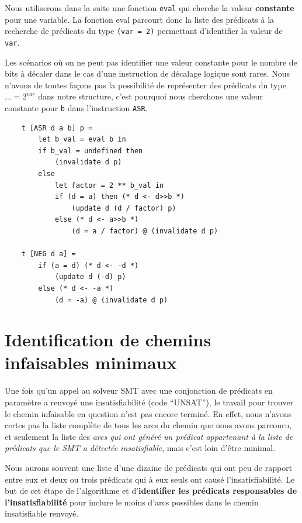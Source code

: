 \documentclass[french]{article}
\begin{document}
  Nous utiliserons dans la suite une fonction \texttt{eval} qui cherche la valeur \textbf{constante} pour une variable.
  La fonction eval parcourt donc la liste des prédicats à la recherche de prédicats du type \texttt{(var = 2)} permettant
  d'identifier la valeur de \texttt{var}.

  Les scénarios où on ne peut pas identifier une valeur constante pour le nombre de bits à décaler dans le cas d'une instruction
  de décalage logique sont rares. Nous n'avons de toutes façons pas la possibilité de représenter des prédicats du type $... = 2^{var}$
  dans notre structure, c'est pourquoi nous cherchons une valeur constante pour \texttt{b} dans l'instruction \texttt{ASR}.

  \begin{lstlisting}
    t [ASR d a b] p =
        let b_val = eval b in
        if b_val = undefined then
            (invalidate d p)
        else
            let factor = 2 ** b_val in
            if (d = a) then (* d <- d>>b *)
                (update d (d / factor) p)
            else (* d <- a>>b *)
                (d = a / factor) @ (invalidate d p)

    t [NEG d a] =
        if (a = d) (* d <- -d *)
            (update d (-d) p)
        else (* d <- -a *)
            (d = -a) @ (invalidate d p)
  \end{lstlisting}

  \newpage{}
  \section{Identification de chemins infaisables minimaux}
  Une fois qu'un appel au solveur SMT avec une conjonction de prédicats en paramètre a renvoyé une insatisfiabilité (code ``UNSAT''), le travail pour trouver le chemin infaisable en question n'est pas encore terminé. En effet, nous n'avons certes pas la liste complète de tous les arcs du chemin que nous avons parcouru, et seulement la liste des \textit{arcs qui ont généré un prédicat appartenant à la liste de prédicats que le SMT a détectée insatisfiable}, mais c'est loin d'être minimal.

  Nous aurons souvent une liste d'une dizaine de prédicats qui ont peu de rapport entre eux et deux ou trois prédicats qui à eux seuls ont causé l'insatisfiabilité. Le but de cet étape de l'algorithme et d'\textbf{identifier les prédicats responsables de l'insatisfiabilité} pour inclure le moins d'arcs possibles dans le chemin insatisfiable renvoyé.
\end{document}

